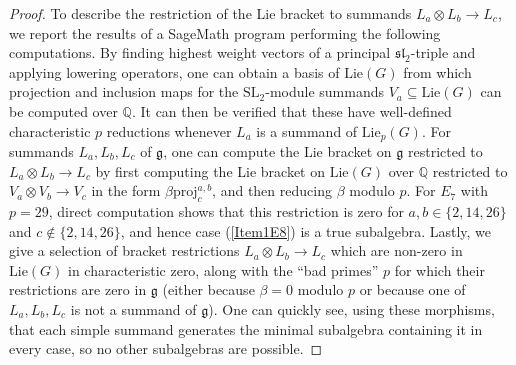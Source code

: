 \documentclass[11pt,a4paper,reqno]{amsart}
\theoremstyle{definition}
\numberwithin{equation}{section}
\newcommand{\mQ}{\mathbb{Q}}
\newcommand{\fg}{\mathfrak{g}}
\newcommand{\fsl}{\mathfrak{sl}}
\newcommand{\Lie}{\mathrm{Lie}}
\newcommand{\SL}{\mathrm{SL}}
\newcommand{\proj}{\mathrm{proj}}
\begin{document}
\begin{proof}
To describe the restriction of the Lie bracket to summands $L_a\otimes L_b\to L_c$, we report the results of a SageMath program performing the following computations. By finding highest weight vectors of a principal $\fsl_2$-triple and applying lowering operators, one can obtain a basis of $\Lie(G)$ from which projection and inclusion maps for the $\SL_2$-module summands $V_a\subseteq\Lie(G)$ can be computed over $\mQ$. It can then be verified that these have well-defined characteristic $p$ reductions whenever $L_a$ is a summand of $\Lie_p(G)$. For summands $L_a,L_b,L_c$ of $\fg$, one can compute the Lie bracket on $\fg$ restricted to $L_a\otimes L_b\to L_c$ by first computing the Lie bracket on $\Lie(G)$ over $\mQ$ restricted to $V_a\otimes V_b\to V_c$ in the form $\beta\proj^{a,b}_c$, and then reducing $\beta$ modulo $p$. For $E_7$ with $p=29$, direct computation shows that this restriction is zero for $a,b\in\{2,14,26\}$ and $c\not\in\{2,14,26\}$, and hence case (\ref{Item1E8}) is a true subalgebra. Lastly, we give a selection of bracket restrictions $L_a\otimes L_b\to L_c$ which are non-zero in $\Lie(G)$ in characteristic zero, along with the ``bad primes'' $p$ for which their restrictions are zero in $\fg$ (either because $\beta=0$ modulo $p$ or because one of $L_a,L_b,L_c$ is not a summand of $\fg$). One can quickly see, using these morphisms, that each simple summand generates the minimal subalgebra containing it in every case, so no other subalgebras are possible.


\end{proof}
\end{document}

